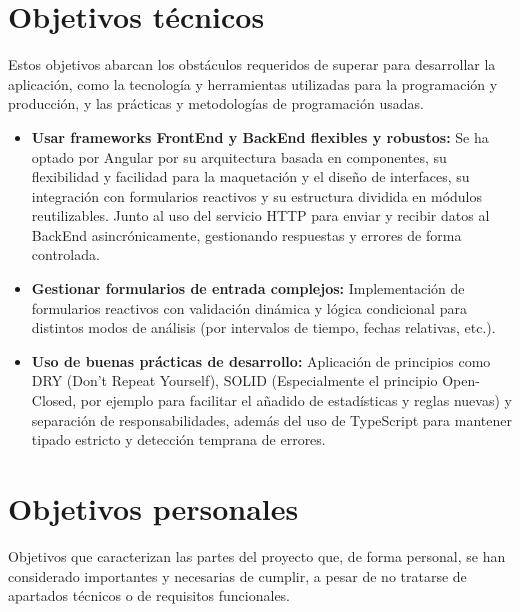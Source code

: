 \section{Objetivos técnicos}

Estos objetivos abarcan los obstáculos requeridos de superar para desarrollar la aplicación, como la tecnología y herramientas utilizadas para la programación y producción, y las prácticas y metodologías de programación usadas.

\begin{itemize}
  \item \textbf{Usar frameworks FrontEnd y BackEnd flexibles y robustos:} Se ha optado por Angular por su arquitectura basada en componentes, su flexibilidad y facilidad para la maquetación y el diseño de interfaces, su integración con formularios reactivos y su estructura dividida en módulos reutilizables. Junto al uso del servicio HTTP para enviar y recibir datos al BackEnd asincrónicamente, gestionando respuestas y errores de forma controlada.
  
  \item \textbf{Gestionar formularios de entrada complejos:} Implementación de formularios reactivos con validación dinámica y lógica condicional para distintos modos de análisis (por intervalos de tiempo, fechas relativas, etc.).

  \item \textbf{Uso de buenas prácticas de desarrollo:} Aplicación de principios como DRY (Don't Repeat Yourself), SOLID (Especialmente el principio Open-Closed, por ejemplo para facilitar el añadido de estadísticas y reglas nuevas) y separación de responsabilidades, además del uso de TypeScript para mantener tipado estricto y detección temprana de errores.

\end{itemize}

\section{Objetivos personales}

Objetivos que caracterizan las partes del proyecto que, de forma personal, se han considerado importantes y necesarias de cumplir, a pesar de no tratarse de apartados técnicos o de requisitos funcionales.

